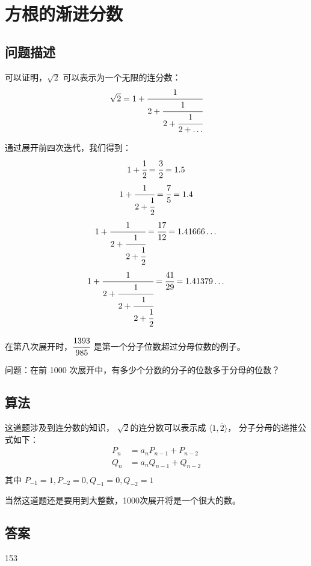 \section{方根的渐进分数}
\subsection{问题描述}
\begin{tcolorbox}
	可以证明，$\sqrt{2}$ 可以表示为一个无限的连分数：
	\[
		\sqrt{2} = 1 + \cfrac{1}{2 + \cfrac{1}{2 + \cfrac{1}{2 + \dots}}}
	\]

	通过展开前四次迭代，我们得到：
	\[
		1 + \cfrac{1}{2} = \cfrac{3}{2} = 1.5
	\]
	\[
		1 + \cfrac{1}{2 + \cfrac{1}{2}} = \cfrac{7}{5} = 1.4
	\]
	\[
		1 + \cfrac{1}{2 + \cfrac{1}{2 + \cfrac{1}{2}}} = \cfrac{17}{12} = 1.41666 \dots
	\]
	\[
		1 + \cfrac{1}{2 + \cfrac{1}{2 + \cfrac{1}{2 + \cfrac{1}{2}}}} = \cfrac{41}{29} = 1.41379 \dots
	\]

	在第八次展开时，$\cfrac{1393}{985}$ 是第一个分子位数超过分母位数的例子。

	问题：在前 1000 次展开中，有多少个分数的分子的位数多于分母的位数？
\end{tcolorbox}

\subsection{算法}
这道题涉及到连分数的知识， $ \sqrt{2} $的连分数可以表示成 $ \langle 1, \overline{2} \rangle $， 分子分母的递推公式如下：
\begin{align*}
	P_n & = a_nP_{n-1} + P_{n-2} \\
	Q_n & = a_nQ_{n-1} + Q_{n-2} \\
\end{align*}
其中 \( P_{-1} = 1, P_{-2} = 0, Q_{-1} = 0, Q_{-2} = 1 \)

当然这道题还是要用到大整数，1000次展开将是一个很大的数。

\subsection{答案}
153
